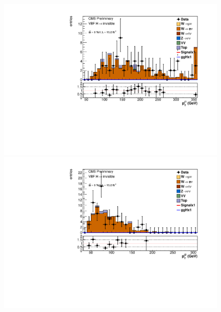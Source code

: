 \begin{figure}
  \includegraphics[width=.6\largefigwidth]{plots/parked/AN-14-243-figs/output_sigreg/enu_jet1_pt.pdf}
  \includegraphics[width=.6\largefigwidth]{plots/parked/AN-14-243-figs/output_sigreg/enu_jet2_pt.pdf}


\end{figure}
